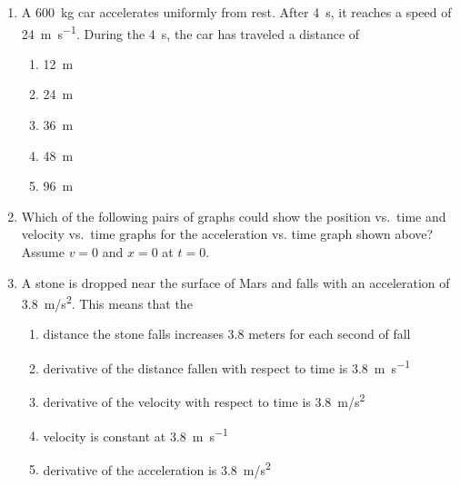 \documentclass{../../../oss-apphys}
\begin{document}
\begin{multicols}{2}
\begin{enumerate}[resume,leftmargin=18pt]
  \item A \SI{600}{\kilo\gram} car accelerates uniformly from rest. After
    \SI{4}{\second}, it reaches a speed of \SI{24}{\metre\per\second}. During
    the \SI{4}{\second}, the car has traveled a distance of
    \begin{enumerate}[nosep,leftmargin=18pt,label=(\Alph*)]
    \item\SI{12}{\metre}
    \item\SI{24}{\metre}
    \item\SI{36}{\metre}
    \item\SI{48}{\metre}
    \item\SI{96}{\metre}
    \end{enumerate}
    \columnbreak
    
  \item Which of the following pairs of graphs could show the position vs.\
    time and velocity vs.\ time graphs for the acceleration vs. time graph
    shown above? Assume $v=0$ and $x=0$ at $t=0$.
    \begin{center}
    \end{center}

  \item A stone is dropped near the surface of Mars and falls with an
    acceleration of \SI{3.8}{m/s^2}. This means that the
    \begin{enumerate}[nosep,leftmargin=18pt,label=(\Alph*)]
    \item distance the stone falls increases 3.8 meters for each second of
      fall
    \item derivative of the distance fallen with respect to time is
      \SI{3.8}{\metre\per\second}
    \item derivative of the velocity with respect to time is \SI{3.8}{m/s^2}
    \item velocity is constant at \SI{3.8}{\metre\per\second}
    \item derivative of the acceleration is \SI{3.8}{m/s^2}
    \end{enumerate}    
    \columnbreak
    

\end{enumerate}
\end{multicols}
\end{document}
